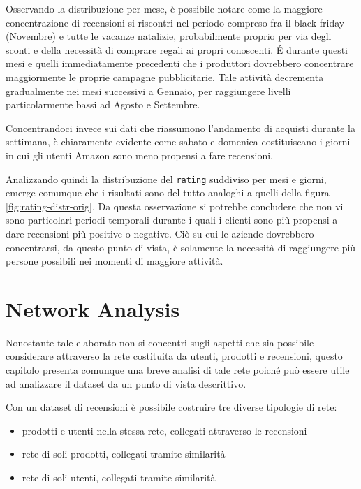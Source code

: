 \documentclass[hidelinks, 12pt]{article}
\begin{document}
Osservando la distribuzione per mese, è possibile notare come la maggiore concentrazione di recensioni si riscontri nel periodo compreso fra il black friday (Novembre) e tutte le vacanze natalizie, probabilmente proprio per via degli sconti e della necessità di comprare regali ai propri conoscenti. É durante questi mesi e quelli immediatamente precedenti che i produttori dovrebbero concentrare maggiormente le proprie campagne pubblicitarie. Tale attività decrementa gradualmente nei mesi successivi a Gennaio, per raggiungere livelli particolarmente bassi ad Agosto e Settembre.

Concentrandoci invece sui dati che riassumono l'andamento di acquisti durante la settimana, è chiaramente evidente come sabato e domenica costituiscano i giorni in cui gli utenti Amazon sono meno propensi a fare recensioni.

Analizzando quindi la distribuzione del \texttt{rating} suddiviso per mesi e giorni, emerge comunque che i risultati sono del tutto analoghi a quelli della figura \ref{fig:rating-distr-orig}. Da questa osservazione si potrebbe concludere che non vi sono particolari periodi temporali durante i quali i clienti sono più propensi a dare recensioni più positive o negative. Ciò su cui le aziende dovrebbero concentrarsi, da questo punto di vista, è solamente la necessità di raggiungere più persone possibili nei momenti di maggiore attività.



\clearpage



\section{Network Analysis}
\label{sec:network-anal}


Nonostante tale elaborato non si concentri sugli aspetti che sia possibile considerare attraverso la rete costituita da utenti, prodotti e recensioni, questo capitolo presenta comunque una breve analisi di tale rete poiché può essere utile ad analizzare il dataset da un punto di vista descrittivo.

\vspace{3ex}

Con un dataset di recensioni è possibile costruire tre diverse tipologie di rete:

\begin{itemize}
	\item prodotti e utenti nella stessa rete, collegati attraverso le recensioni
	\item rete di soli prodotti, collegati tramite similarità
	\item rete di soli utenti, collegati tramite similarità
\end{itemize}
\end{document}
